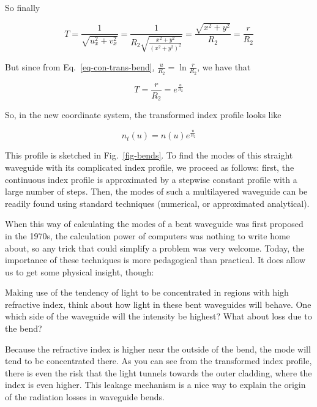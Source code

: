 So finally

\begin{equation}
T = \frac{1}{\sqrt{u_x^2+v_x^2}} = \frac{1}{R_2 \sqrt{\frac{x^2+y^2}{(x^2+y^2)^2}}} = \frac{\sqrt{x^2+y^2}}{R_2} = \frac{r}{R_2}
\end{equation} 

But since from Eq.~\ref{eq-con-trans-bend}, $\frac{u}{R_2}=\ln{\frac{r}{R_2}}$, we have that 

\begin{equation}
T = \frac{r}{R_2} = e^{\frac{u}{R_2}}
\end{equation} 

So, in the new coordinate system, the transformed index profile looks like

\begin{equation}
n_t(u) = n(u)e^{\frac{u}{R_2}}
\end{equation} 

This profile is sketched in Fig.~\ref{fig-bends}. To find the modes of this straight waveguide with its complicated index profile, we proceed as follows: first, the continuous index profile is approximated by a stepwise constant profile with a large number of steps. Then, the modes of such a multilayered waveguide can be readily found using standard techniques (numerical, or approximated analytical).

When this way of calculating the modes of a bent waveguide was first proposed in the 1970s, the calculation power of computers was nothing to write home about, so any trick that could simplify a problem was very welcome. Today, the importance of these techniques is more pedagogical than practical. It does allow us to get some physical insight, though:

\begin{cue}
Making use of the tendency of light to be concentrated in regions with high refractive index, think about how light in these bent waveguides will behave. One which side of the waveguide will the intensity be highest? What about loss due to the bend? 
\end{cue}

Because the refractive index is higher near the outside of the bend, the mode will tend to be concentrated there. As you can see from the transformed index profile, there is even the risk that the light tunnels towards the outer cladding, where the index is even higher. This leakage mechanism is a nice way to explain the origin of the radiation losses in waveguide bends. 

